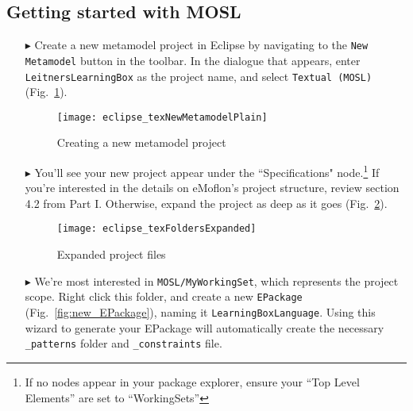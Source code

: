 \clearpage
\subsection{Getting started with MOSL}
\texHeader
\hypertarget{static:starting tex}{} 

\begin{itemize}

\item[$\blacktriangleright$] Create a new metamodel project in Eclipse by navigating to the \texttt{New Metamodel} button in the toolbar. In the dialogue that
appears, enter \texttt{LeitnersLearningBox} as the project name, and select \texttt{Textual (MOSL)}  (Fig.~\ref{fig:new_project}).

\vspace{1cm}

\begin{figure}[htbp]
	\centering
  \texttt{[image: eclipse\_texNewMetamodelPlain]}
	\caption{Creating a new metamodel project}
	\label{fig:new_project}
\end{figure}

\vspace{1cm}

\item[$\blacktriangleright$] You'll see your new project appear under the ``Specifications" node.\footnote{If no nodes appear in your package explorer,
ensure your ``Top Level Elements'' are set to ``WorkingSets''} If you're interested in the details on eMoflon's project structure, review section
4.2 from Part I. Otherwise, expand the project as deep as it goes (Fig.~\ref{fig:expanded_folders}).

\clearpage

\begin{figure}[htbp]
	\centering
  \texttt{[image: eclipse\_texFoldersExpanded]}
	\caption{Expanded project files}
	\label{fig:expanded_folders}
\end{figure} 

\vspace{0.5cm}

\item[$\blacktriangleright$] We're most interested in \texttt{MOSL/MyWorkingSet}, which represents the project scope. Right click this folder, and create a new
\texttt{EPackage} (Fig.~\ref{fig:new_EPackage}), naming it \texttt{LearningBoxLanguage}. Using this wizard to generate your EPackage will automatically create
the necessary \texttt{\_patterns} folder and \texttt{\_constraints} file.


\end{itemize}
